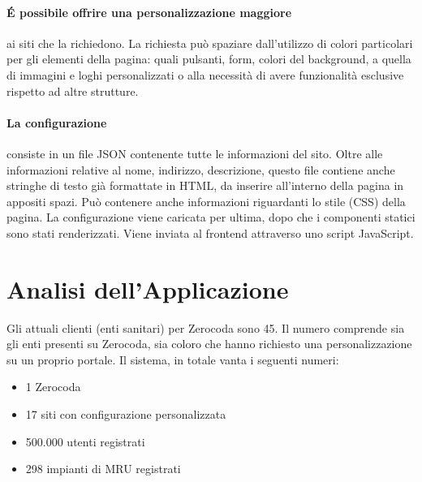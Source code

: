 \paragraph{É possibile offrire una  personalizzazione maggiore} ai siti che la richiedono. La richiesta può spaziare dall'utilizzo di colori particolari per gli elementi della pagina: quali pulsanti, form, colori del background, a quella di immagini e loghi personalizzati o alla necessità di avere funzionalità esclusive rispetto ad altre strutture.

\paragraph{La configurazione} consiste in un file JSON contenente tutte le informazioni del sito. Oltre alle informazioni relative al nome, indirizzo, descrizione, questo file contiene anche stringhe di testo già formattate in HTML, da inserire all'interno della pagina in appositi spazi. Può contenere anche informazioni riguardanti lo stile (CSS) della pagina. La configurazione viene caricata per ultima, dopo che i componenti statici sono stati renderizzati. Viene inviata al frontend attraverso uno script JavaScript.

\section{Analisi dell'Applicazione}
Gli attuali clienti (enti sanitari) per Zerocoda sono 45. Il numero comprende sia gli enti presenti su Zerocoda, sia coloro che hanno richiesto una personalizzazione su un proprio portale. Il sistema, in totale vanta i seguenti numeri:
\begin{itemize}
    \item 1 Zerocoda
    \item 17 siti con configurazione personalizzata
    \item 500.000 utenti registrati
    \item 298 impianti di MRU registrati
\end{itemize}


